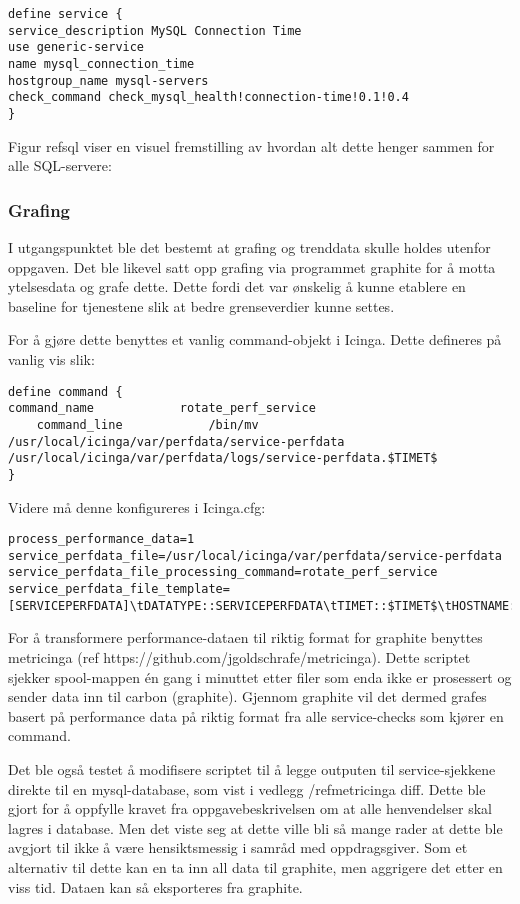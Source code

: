 \begin{lstlisting}
define service {
service_description MySQL Connection Time
use generic-service
name mysql_connection_time
hostgroup_name mysql-servers
check_command check_mysql_health!connection-time!0.1!0.4
}
\end{lstlisting}

Figur ref{sql} viser en visuel fremstilling av hvordan alt dette henger sammen for alle SQL-servere:

\subsubsection{Grafing}
I utgangspunktet ble det bestemt at grafing og trenddata skulle holdes utenfor oppgaven. Det ble likevel satt opp grafing via programmet graphite for å motta ytelsesdata og grafe dette. Dette fordi det var ønskelig å kunne etablere en baseline for tjenestene slik at bedre grenseverdier kunne settes.

For å gjøre dette benyttes et vanlig command-objekt i Icinga. Dette defineres på vanlig vis slik:

\begin{lstlisting}
define command {
command_name            rotate_perf_service
    command_line            /bin/mv /usr/local/icinga/var/perfdata/service-perfdata /usr/local/icinga/var/perfdata/logs/service-perfdata.$TIMET$
}
\end{lstlisting}
Videre må denne konfigureres i Icinga.cfg:

\begin{lstlisting}
process_performance_data=1
service_perfdata_file=/usr/local/icinga/var/perfdata/service-perfdata
service_perfdata_file_processing_command=rotate_perf_service
service_perfdata_file_template=[SERVICEPERFDATA]\tDATATYPE::SERVICEPERFDATA\tTIMET::$TIMET$\tHOSTNAME::$HOSTNAME$\tSERVICEDESC::$SERVICEDESC$\tSERVICEPERFDATA::$SERVICEPERFDATA$service_perfdata_file_processing_interval=200
\end{lstlisting}

For å transformere performance-dataen til riktig format for graphite benyttes metricinga (ref https://github.com/jgoldschrafe/metricinga). Dette scriptet sjekker spool-mappen én gang i minuttet etter filer som enda ikke er prosessert og sender data inn til carbon (graphite). 
Gjennom graphite vil det dermed grafes basert på performance data på riktig format fra alle service-checks som kjører en command.

Det ble også testet å modifisere scriptet til å legge outputen til service-sjekkene direkte til en mysql-database, som vist i vedlegg /ref{metricinga diff}. Dette ble gjort for å oppfylle kravet fra oppgavebeskrivelsen om at alle henvendelser skal lagres i database. Men det viste seg at dette ville bli så mange rader at dette ble avgjort til ikke å være hensiktsmessig i samråd med oppdragsgiver. Som et alternativ til dette kan en ta inn all data til graphite, men aggrigere det etter en viss tid. Dataen kan så eksporteres fra graphite.

